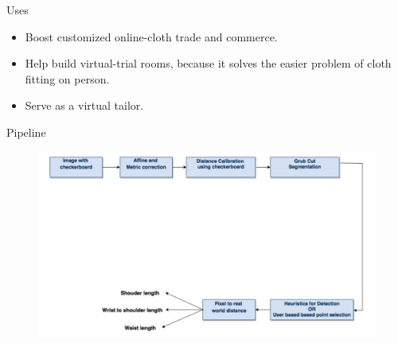 \documentclass{beamer}
\begin{document}
\begin{frame}{Uses}
  \begin{itemize}
  \item Boost customized online-cloth trade and commerce.
  \bigskip
  \item Help build virtual-trial rooms, because it solves the easier problem of cloth fitting on person.
  \bigskip
  \item Serve as a virtual tailor.
  \end{itemize}
\end{frame}


\begin{frame}{Pipeline}
\begin{figure}[h]
\includegraphics[width=\textwidth]{flow.png}
\end{figure}
\end{frame}

  
  
  
  
 
\end{document}
